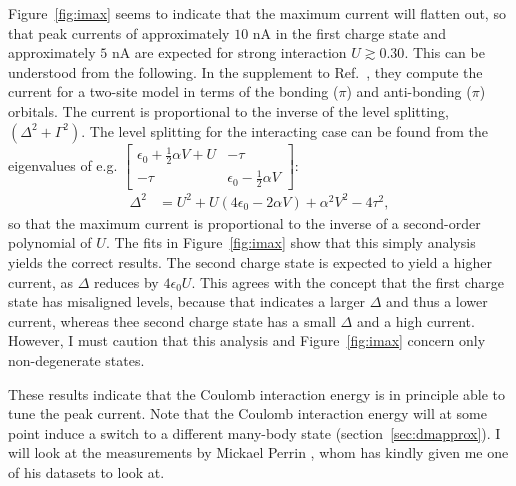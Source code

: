 Figure~\ref{fig:imax} seems to indicate that the maximum current will flatten out, so that peak currents of approximately $10$ nA in the first charge state and approximately $5$ nA are expected for strong interaction $U \gtrsim 0.30$. This can be understood from the following. In the supplement to Ref.~\cite{perrinnano}, they compute the current for a two-site model in terms of the bonding ($\pi$) and anti-bonding ($\pi$) orbitals. The current is proportional to the inverse of the level splitting, $\left( \Delta^2 + \Gamma^2 \right)$. The level splitting for the interacting case can be found from the eigenvalues of e.g. $\begin{bmatrix} \epsilon_0 + \frac{1}{2} \alpha V+U & -\tau \\
-\tau & \epsilon_0 - \frac{1}{2} \alpha V\end{bmatrix}$:
\begin{align*}
\Delta^2 &= U^2 + U \left(4\epsilon_0 - 2 \alpha V\right) + \alpha^2 V^2 - 4 \tau^2,
\end{align*}
so that the maximum current is proportional to the inverse of a second-order polynomial of $U$. The fits in Figure~\ref{fig:imax} show that this simply analysis yields the correct results. The second charge state is expected to yield a higher current, as $\Delta$ reduces by $4 \epsilon_0 U$. This agrees with the concept that the first charge state has misaligned levels, because that indicates a larger $\Delta$ and thus a lower current, whereas thee second charge state has a small $\Delta$ and a high current. However, I must caution that this analysis and Figure~\ref{fig:imax} concern only non-degenerate states.

These results indicate that the Coulomb interaction energy is in principle able to tune the peak current. Note that the Coulomb interaction energy will at some point induce a switch to a different many-body state (section~\ref{sec:dmapprox}). I will look at the measurements by Mickael Perrin \cite{perrin, perrinnano}, whom has kindly given me one of his datasets to look at. 

